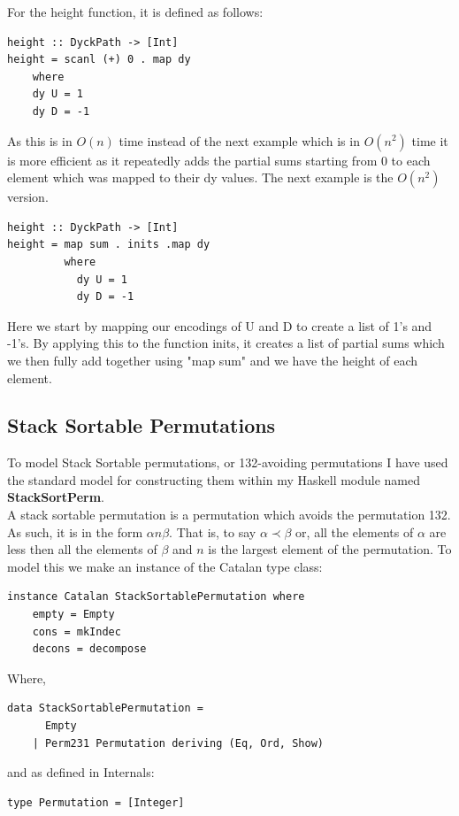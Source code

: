 \documentclass[12pt]{article}
\begin{document}
For the height function, it is defined as follows:
\begin{lstlisting}
height :: DyckPath -> [Int]
height = scanl (+) 0 . map dy
	where 
	dy U = 1
	dy D = -1
\end{lstlisting}
As this is in $O(n)$ time instead of the next example which is in $O(n^2)$ time it is more efficient as it repeatedly adds the partial sums starting from 0 to each element which was mapped to their dy values. The next example is the $O(n^2)$ version.
\begin{lstlisting}
height :: DyckPath -> [Int]
height = map sum . inits .map dy
         where
           dy U = 1
           dy D = -1
\end{lstlisting}
Here we start by mapping our encodings of U and D to create a list of 1's and -1's. By applying this to the function inits, it creates a list of partial sums which we then fully add together using "map sum" and we have the height of each element.\\

\subsection{Stack Sortable Permutations}
To model Stack Sortable permutations, or 132-avoiding permutations I have used the standard model for constructing them within my Haskell module named {\bf StackSortPerm}.\\
A stack sortable permutation is a permutation which avoids the permutation 132. As such, it is in the form $\alpha n \beta$. That is, to say $\alpha \prec \beta$ or, all the elements of $\alpha$ are less then all the elements of $\beta$ and $n$ is the largest element of the permutation. To model this we make an instance of the Catalan type class:
\begin{lstlisting}
instance Catalan StackSortablePermutation where
	empty = Empty	
	cons = mkIndec
	decons = decompose
\end{lstlisting}
Where, 
\begin{lstlisting}
data StackSortablePermutation = 
  	  Empty 
	| Perm231 Permutation deriving (Eq, Ord, Show)
\end{lstlisting}
and as defined in Internals:
\begin{lstlisting}
type Permutation = [Integer]
\end{lstlisting}
\end{document}
